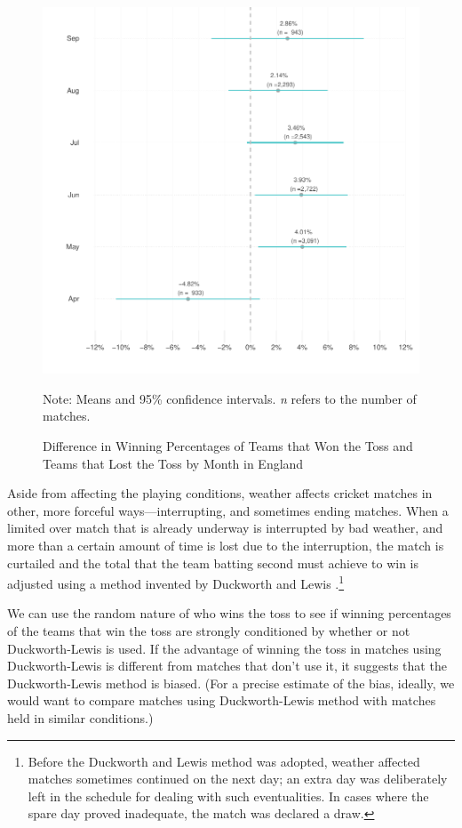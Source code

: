 \documentclass[12pt]{article}
\begin{document}
\begin{figure}[htbp]
\centering
\caption{Difference in Winning Percentages of Teams that Won the Toss and Teams that Lost the Toss by Month in England}
\includegraphics[scale=.85]{../figs/winbyMonthEngland.pdf}
{\footnotesize Note: Means and 95\% confidence intervals. \emph{n} refers to the number of matches.\par}
\label{fig:season}
\end{figure}

Aside from affecting the playing conditions, weather affects cricket matches in other, more forceful ways---interrupting, and sometimes ending matches. When a limited over match that is already underway is interrupted by bad weather, and more than a certain amount of time is lost due to the interruption, the match is curtailed and the total that the team batting second must achieve to win is adjusted using a method invented by Duckworth and Lewis \citep[see][]{duckworth1998}.\footnote{Before the Duckworth and Lewis method was adopted, weather affected matches sometimes continued on the next day; an extra day was deliberately left in the schedule for dealing with such eventualities. In cases where the spare day proved inadequate, the match was declared a draw.} 

We can use the random nature of who wins the toss to see if winning percentages of the teams that win the toss are strongly conditioned by whether or not Duckworth-Lewis is used. If the advantage of winning the toss in matches using Duckworth-Lewis is different from matches that don't use it, it suggests that the Duckworth-Lewis method is biased. (For a precise estimate of the bias, ideally, we would want to compare matches using Duckworth-Lewis method with matches held in similar conditions.)
\end{document}
